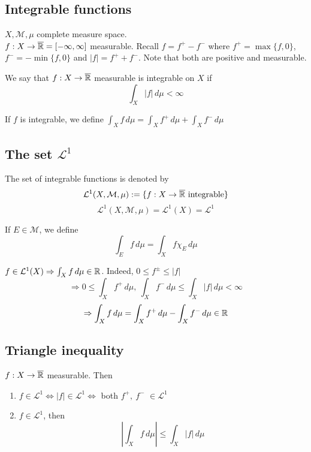 \subsection{Integrable functions}
\(X, \mathcal{M}, \mu\) complete measure space. \\
\(f: X \to \overline{\mathbb{R}} = [-\infty, \infty]\) measurable. Recall \(f= f^+ - f^- \) where \(f^+ = \max{\{f, 0\}}\), \(f^- = -\min{\{f, 0\}} \) and \(|f|= f^+ + f^-\). 
Note that both are positive and measurable. 

\begin{definition}
    We say that \(f:X \to \overline{\mathbb{R}}\) measurable is integrable on \(X\) if 
    \[
        \int_X |f| \, d\mu < \infty
    \]
\end{definition}

If \(f\) is integrable, we define \(\int_X f \, d\mu = \int_X f^+ \, d\mu + \int_X f^- \, d\mu\) 
\subsection{The set \texorpdfstring{\(\mathcal{L}^1\)}{L1}}
The set of integrable functions is denoted by 
\[
    \mathcal{L}^1 (X, \mathcal{M}, \mu) := \{f:X \to \overline{\mathbb{R}} \text{ integrable} \} 
\]
\[
    \mathcal{L}^1 (X, \mathcal{M}, \mu) 
    = \mathcal{L}^1 (X) 
    = \mathcal{L}^1 
\]

If \(E \in \mathcal{M}\), we define
\[
    \int_E f \, d\mu = \int_X f \chi_E \, d\mu
\]

\begin{remark}
    \(f \in \mathcal{L}^1(X) \Rightarrow \int_X f \, d\mu \in \mathbb{R}\). Indeed, \(0 \leq f^\pm \leq |f|\)
    \[
        \Rightarrow 0 \leq \int_X f^+ \, d\mu ,\ \int_X f^- \, d\mu \leq \int_X |f| \, d\mu < \infty 
    \] 
    \[
        \Rightarrow \int_X f \, d\mu = \int_X f^+ \, d\mu - \int_X f^- \, d\mu \in \mathbb{R}
    \]
\end{remark}
\subsection{Triangle inequality}
\begin{proposition}
    \(f : X \to \overline{\mathbb{R}} \) measurable. Then
    \begin{enumerate}
        \item \(f \in \mathcal{L}^1 \Leftrightarrow |f| \in \mathcal{L}^1 \Leftrightarrow \) both \(f^+, \ f^-\) \(\in \mathcal{L}^1\)
        \item \(f \in \mathcal{L}^1 \), then 
        \[
            \left| \int_X f \, d\mu \right| \leq \int_X |f| \, d\mu  \tag{triangle inequality}
        \]
    \end{enumerate}
\end{proposition}

